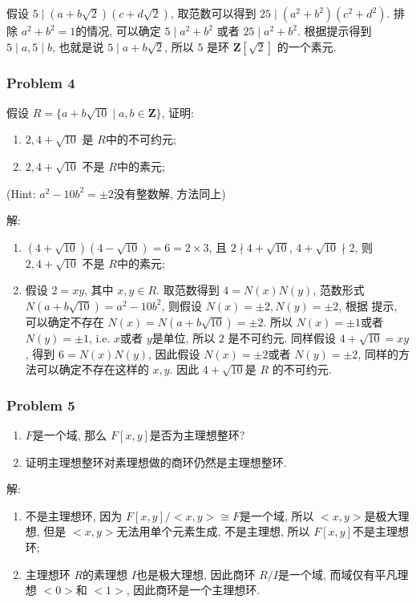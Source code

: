 \documentclass[a4paper,12pt]{ctexart}
\newcommand{\Z}{\mathbf{Z}}
\begin{document}
    假设 $ 5\mid (a+b\sqrt{2})(c+d\sqrt{2}) $, 取范数可以得到 $ 25\mid (a^2+b^2)(c^2+d^2) $. 排除 $ a^2+b^2=1 $的情况, 可以确定 $ 5\mid a^2+b^2 $
    或者 $ 25\mid a^2+b^2 $. 根据提示得到 $ 5\mid a,5\mid b $, 也就是说 $ 5\mid a+b\sqrt{2} $, 所以 $ 5 $ 是环 $ \Z[\sqrt{2}] $ 的一个素元.
\subsubsection*{Problem 4}
    假设 $ R=\{a+b\sqrt{10}\mid a,b\in\Z\} $, 证明:
    \begin{enumerate}
      \item $ 2, 4+\sqrt{10} $ 是 $ R $中的不可约元;
      \item $ 2, 4+\sqrt{10} $ 不是 $ R $中的素元;
    \end{enumerate}
    (Hint: $ a^2-10b^2=\pm 2 $没有整数解, 方法同上)

    解: \begin{enumerate}
      \item $ (4+\sqrt{10})(4-\sqrt{10})=6=2\times 3 $, 且 $ 2\nmid 4+\sqrt{10} $, $ 4+\sqrt{10}\nmid 2 $, 则 $ 2, 4+\sqrt{10} $ 不是 $ R $中的素元;
      \item 假设 $ 2=xy $, 其中 $ x,y\in R $. 取范数得到 $ 4=N(x)N(y) $, 范数形式  $ N(a+b\sqrt{10})=a^2-10b^2 $, 则假设 $ N(x)=\pm 2,N(y)=\pm 2 $, 根据
      提示, 可以确定不存在 $ N(x)=N(a+b\sqrt{10})=\pm 2 $. 所以 $ N(x)=\pm 1 $或者 $ N(y)=\pm 1 $, i.e. $ x $或者 $ y $是单位, 所以 $ 2 $ 是不可约元. 
      同样假设 $ 4+\sqrt{10}=xy $, 得到 $ 6=N(x)N(y) $, 因此假设 $ N(x)=\pm 2 $或者 $ N(y)=\pm 2 $, 同样的方法可以确定不存在这样的 $ x,y $. 因此 $ 4+\sqrt{10} $是 $ R $
      的不可约元. 
    \end{enumerate}
\subsubsection*{Problem 5}
    \begin{enumerate}
      \item $ F $是一个域, 那么 $ F[x,y] $是否为主理想整环?
      \item 证明主理想整环对素理想做的商环仍然是主理想整环.
    \end{enumerate}

    解:\begin{enumerate}
      \item 不是主理想环, 因为 $ F[x,y]/<x,y>\cong F $是一个域, 所以 $ <x,y> $是极大理想, 但是 $ <x,y> $无法用单个元素生成, 不是主理想, 所以 $ F[x,y] $不是主理想环;
      \item 主理想环 $ R $的素理想 $ I $也是极大理想, 因此商环 $ R/I $是一个域, 而域仅有平凡理想 $ <0> $和 $ <1> $, 因此商环是一个主理想环. 
    \end{enumerate}
\end{document}
